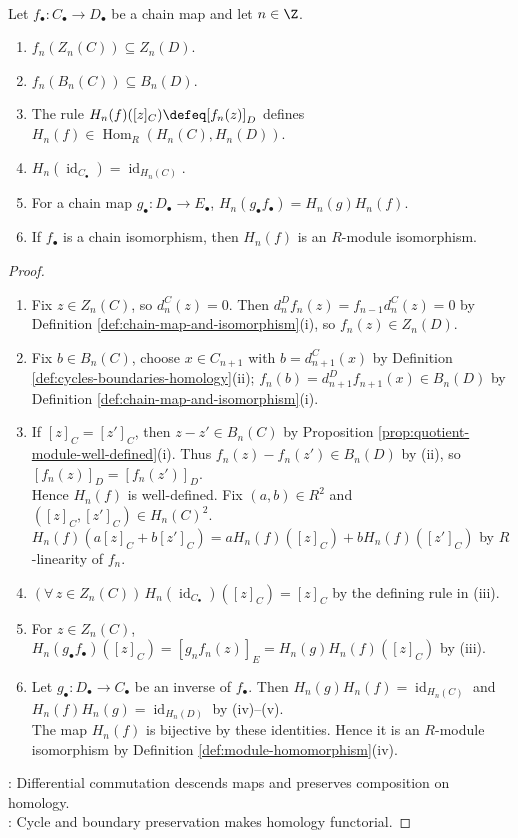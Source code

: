 \begin{proposition} \label{prop:homology-functoriality} \\
Let $f_\bullet:C_\bullet\to D_\bullet$ be a chain map and let $n\in\Z$.
\begin{enumerate}[label=(\roman*)]
\setlength{\itemsep}{0pt}
\item $f_n(Z_n(C))\subseteq Z_n(D)$.
\item $f_n(B_n(C))\subseteq B_n(D)$.
\item The rule $H_n(f)([z]_C)\defeq[f_n(z)]_D$ defines $H_n(f)\in\operatorname{Hom}_R(H_n(C),H_n(D))$.
\item $H_n(\operatorname{id}_{C_\bullet})=\operatorname{id}_{H_n(C)}$.
\item For a chain map $g_\bullet:D_\bullet\to E_\bullet$, $H_n(g_\bullet f_\bullet)=H_n(g)H_n(f)$.
\item If $f_\bullet$ is a chain isomorphism, then $H_n(f)$ is an $R$-module isomorphism.
\end{enumerate}
\begin{proof}
\begin{enumerate}[label=(\roman*)]
\setlength{\itemsep}{0pt}
\item Fix $z\in Z_n(C)$, so $d^C_n(z)=0$. Then $d^D_nf_n(z)=f_{n-1}d^C_n(z)=0$ by Definition \ref{def:chain-map-and-isomorphism}(i), so $f_n(z)\in Z_n(D)$.
\item Fix $b\in B_n(C)$, choose $x\in C_{n+1}$ with $b=d^C_{n+1}(x)$ by Definition \ref{def:cycles-boundaries-homology}(ii); $f_n(b)=d^D_{n+1}f_{n+1}(x)\in B_n(D)$ by Definition \ref{def:chain-map-and-isomorphism}(i).
\item If $[z]_C=[z']_C$, then $z-z'\in B_n(C)$ by Proposition \ref{prop:quotient-module-well-defined}(i). Thus $f_n(z)-f_n(z')\in B_n(D)$ by (ii), so $[f_n(z)]_D=[f_n(z')]_D$.\\
Hence $H_n(f)$ is well-defined. Fix $(a,b)\in R^2$ and $([z]_C,[z']_C)\in H_n(C)^2$.\\
$H_n(f)(a[z]_C+b[z']_C)=aH_n(f)([z]_C)+bH_n(f)([z']_C)$ by $R$-linearity of $f_n$.
\item $(\forall\,z\in Z_n(C))\,H_n(\operatorname{id}_{C_\bullet})([z]_C)=[z]_C$ by the defining rule in (iii).
\item For $z\in Z_n(C)$, $H_n(g_\bullet f_\bullet)([z]_C)=[g_nf_n(z)]_E=H_n(g)H_n(f)([z]_C)$ by (iii).
\item Let $g_\bullet:D_\bullet\to C_\bullet$ be an inverse of $f_\bullet$. Then $H_n(g)H_n(f)=\operatorname{id}_{H_n(C)}$ and $H_n(f)H_n(g)=\operatorname{id}_{H_n(D)}$ by (iv)--(v).\\
The map $H_n(f)$ is bijective by these identities. Hence it is an $R$-module isomorphism by Definition \ref{def:module-homomorphism}(iv).
\end{enumerate}
: Differential commutation descends maps and preserves composition on homology.\\
: Cycle and boundary preservation makes homology functorial.
\end{proof}
\end{proposition}

